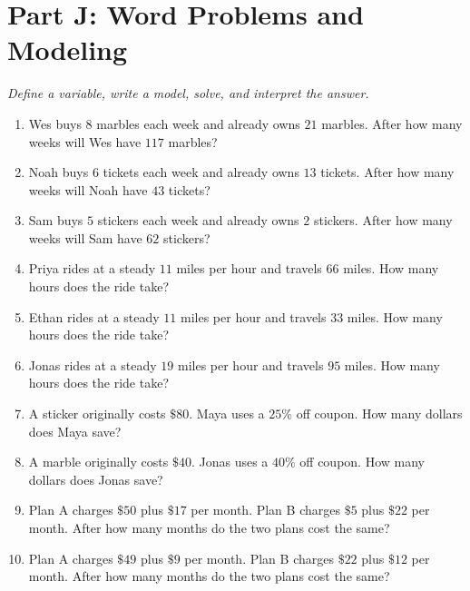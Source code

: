 \documentclass[11pt]{article}
\begin{document}
\section*{Part J: Word Problems and Modeling}
\noindent\textit{Define a variable, write a model, solve, and interpret the answer.}
\begin{enumerate}
  \item Wes buys $8$ marbles each week and already owns $21$ marbles. After how many weeks will Wes have $117$ marbles?
  \vspace{2.0cm}
  \item Noah buys $6$ tickets each week and already owns $13$ tickets. After how many weeks will Noah have $43$ tickets?
  \vspace{2.0cm}
  \item Sam buys $5$ stickers each week and already owns $2$ stickers. After how many weeks will Sam have $62$ stickers?
  \vspace{2.0cm}
  \item Priya rides at a steady $11$ miles per hour and travels $66$ miles. How many hours does the ride take?
  \vspace{2.0cm}
  \item Ethan rides at a steady $11$ miles per hour and travels $33$ miles. How many hours does the ride take?
  \vspace{2.0cm}
  \item Jonas rides at a steady $19$ miles per hour and travels $95$ miles. How many hours does the ride take?
  \vspace{2.0cm}
  \item A sticker originally costs $\$80$. Maya uses a $25\%$ off coupon. How many dollars does Maya save?
  \vspace{2.0cm}
  \item A marble originally costs $\$40$. Jonas uses a $40\%$ off coupon. How many dollars does Jonas save?
  \vspace{2.0cm}
  \item Plan A charges $\$50$ plus $\$17$ per month. Plan B charges $\$5$ plus $\$22$ per month. After how many months do the two plans cost the same?
  \vspace{2.0cm}
  \item Plan A charges $\$49$ plus $\$9$ per month. Plan B charges $\$22$ plus $\$12$ per month. After how many months do the two plans cost the same?
  \vspace{2.0cm}
\end{enumerate}
\end{document}

